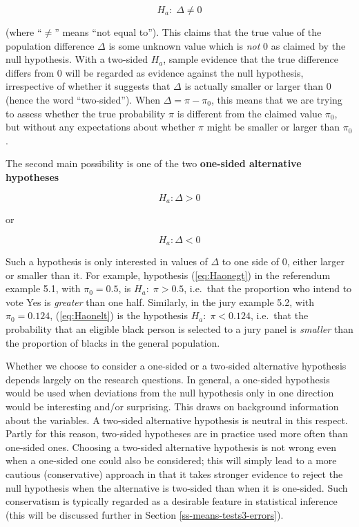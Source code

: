 \documentclass[11pt,a4paper,openany]{book}
\begin{document}
\begin{equation}H_{a}: \; \Delta\ne 0
\label{eq:Hatwo}\end{equation}

(where ``\(\ne\)'' means ``not equal to''). This claims that the true
value of the population difference \(\Delta\) is some unknown value
which is \emph{not} 0 as claimed by the null hypothesis. With a
two-sided \(H_{a}\), sample evidence that the true difference differs
from 0 will be regarded as evidence against the null hypothesis,
irrespective of whether it suggests that \(\Delta\) is actually smaller
or larger than 0 (hence the word ``two-sided''). When
\(\Delta=\pi-\pi_{0}\), this means that we are trying to assess whether
the true probability \(\pi\) is different from the claimed value
\(\pi_{0}\), but without any expectations about whether \(\pi\) might be
smaller or larger than \(\pi_{0}\).

The second main possibility is one of the two \textbf{one-sided
alternative hypotheses}

\begin{equation}
H_{a}:  \Delta> 0\label{eq:Haonegt}\end{equation}

or

\begin{equation}H_{a}:  \Delta < 0
\label{eq:Haonelt}\end{equation}

Such a hypothesis is only interested in values of \(\Delta\) to one side
of 0, either larger or smaller than it. For example, hypothesis
(\ref{eq:Haonegt}) in the referendum example 5.1, with \(\pi_{0}=0.5\),
is \(H_{a}:\; \pi>0.5\), i.e.~that the proportion who intend to vote Yes
is \emph{greater} than one half. Similarly, in the jury example 5.2,
with \(\pi_{0}=0.124\), (\ref{eq:Haonelt}) is the hypothesis
\(H_{a}:\; \pi<0.124\), i.e.~that the probability that an eligible black
person is selected to a jury panel is \emph{smaller} than the proportion
of blacks in the general population.

Whether we choose to consider a one-sided or a two-sided alternative
hypothesis depends largely on the research questions. In general, a
one-sided hypothesis would be used when deviations from the null
hypothesis only in one direction would be interesting and/or surprising.
This draws on background information about the variables. A two-sided
alternative hypothesis is neutral in this respect. Partly for this
reason, two-sided hypotheses are in practice used more often than
one-sided ones. Choosing a two-sided alternative hypothesis is not wrong
even when a one-sided one could also be considered; this will simply
lead to a more cautious (conservative) approach in that it takes
stronger evidence to reject the null hypothesis when the alternative is
two-sided than when it is one-sided. Such conservatism is typically
regarded as a desirable feature in statistical inference (this will be
discussed further in Section \ref{ss-means-tests3-errors}).
\end{document}
